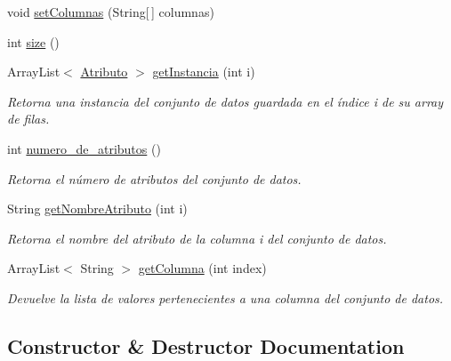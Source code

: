 \begin{DoxyCompactItemize}
void \mbox{\hyperlink{classull_1_1herramientas_1_1opendatachartgenerator_1_1_dataset_ab202a3c49e1a2aa69f40d6c5d8e96bc2}{set\+Columnas}} (String\mbox{[}$\,$\mbox{]} columnas)
\item 
int \mbox{\hyperlink{classull_1_1herramientas_1_1opendatachartgenerator_1_1_dataset_aaf8ec45f3cd314bf5eb9c233ab94328d}{size}} ()
\item 
Array\+List$<$ \mbox{\hyperlink{classull_1_1herramientas_1_1opendatachartgenerator_1_1_atributo}{Atributo}} $>$ \mbox{\hyperlink{classull_1_1herramientas_1_1opendatachartgenerator_1_1_dataset_a696a9dfd92ba71e8fe28d3c6cb7de05a}{get\+Instancia}} (int i)
\begin{DoxyCompactList}\small\item\em Retorna una instancia del conjunto de datos guardada en el índice i de su array de filas. \end{DoxyCompactList}\item 
int \mbox{\hyperlink{classull_1_1herramientas_1_1opendatachartgenerator_1_1_dataset_a011879709e156c54e099949f0e59e1d6}{numero\+\_\+de\+\_\+atributos}} ()
\begin{DoxyCompactList}\small\item\em Retorna el número de atributos del conjunto de datos. \end{DoxyCompactList}\item 
String \mbox{\hyperlink{classull_1_1herramientas_1_1opendatachartgenerator_1_1_dataset_a2992d2c0880bea4d777dc4c09f1e288c}{get\+Nombre\+Atributo}} (int i)
\begin{DoxyCompactList}\small\item\em Retorna el nombre del atributo de la columna i del conjunto de datos. \end{DoxyCompactList}\item 
Array\+List$<$ String $>$ \mbox{\hyperlink{classull_1_1herramientas_1_1opendatachartgenerator_1_1_dataset_a9de53a532ec00647171d6dd7a614d1ef}{get\+Columna}} (int index)
\begin{DoxyCompactList}\small\item\em Devuelve la lista de valores pertenecientes a una columna del conjunto de datos. \end{DoxyCompactList}\end{DoxyCompactItemize}


\subsection{Constructor \& Destructor Documentation}
\mbox{\label{classull_1_1herramientas_1_1opendatachartgenerator_1_1_dataset_a072582f59ed98fb752261920a684441c}} 
